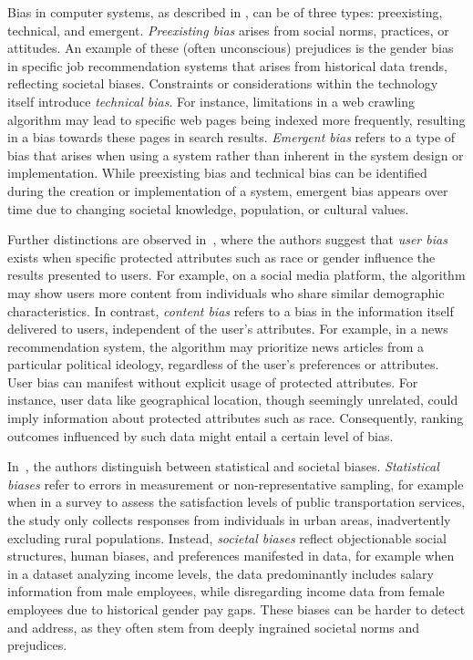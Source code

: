 Bias in computer systems, as described in \cite{friedman1996bias}, can be of three types: preexisting, technical, and emergent. \emph{Preexisting bias} arises from social norms, practices, or attitudes.
An example of these (often unconscious) prejudices is the gender bias in specific job recommendation systems that arises from historical data trends, reflecting societal biases.
Constraints or considerations within the technology itself introduce \emph{technical bias}. For instance, limitations in a web crawling algorithm may lead to specific web pages being indexed more frequently, resulting in a bias towards these pages in search results.
\emph{Emergent bias} refers to a type of bias that arises when using a system rather than inherent in the system design or implementation. While preexisting bias and technical bias can be identified during the creation or implementation of a system, emergent bias appears over time due to changing societal knowledge, population, or cultural values.

Further distinctions are observed in~\cite{pitoura2018measuring},
where the authors suggest that \emph{user bias} exists when specific protected attributes such as race or gender influence the results presented to users.
For example, on a social media platform, the algorithm may show users more content from individuals who share similar demographic characteristics.
In contrast, \emph{content bias} refers to a bias in the information itself delivered to users, independent of the user's attributes. For example, in a news recommendation system, the algorithm may prioritize news articles from a particular political ideology, regardless of the user's preferences or attributes.
User bias can manifest without explicit usage of protected attributes. For instance, user data like geographical location, though seemingly unrelated, could imply information about protected attributes such as race. Consequently, ranking outcomes influenced by such data might entail a certain level of bias. 

In~\cite{pitoura2020social}, the authors distinguish between statistical and societal biases. \emph{Statistical biases} refer to errors in measurement or non-representative sampling, for example when in a survey to assess the satisfaction levels of public transportation services, the study only collects responses from individuals in urban areas, inadvertently excluding rural populations.
Instead, \emph{societal biases} reflect objectionable social structures, human biases, and preferences manifested in data, for example when in a dataset analyzing income levels, the data predominantly includes salary information from male employees, while disregarding income data from female employees due to historical gender pay gaps.
These biases can be harder to detect and address, as they often stem from deeply ingrained societal norms and prejudices.

